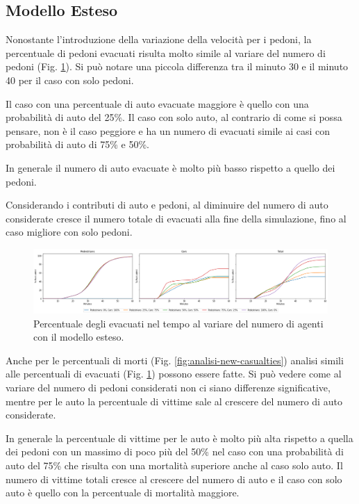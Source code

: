 \pagebreak

\subsection{Modello Esteso}
Nonostante l'introduzione della variazione della velocità per i pedoni,
la percentuale di pedoni evacuati risulta molto simile al variare del numero di pedoni (Fig. \ref{fig:analisi-new-evacuated}).
Si può notare una piccola differenza tra il minuto 30 e il minuto 40 per il caso con solo pedoni.

Il caso con una percentuale di auto evacuate maggiore è quello con una probabilità di auto del 25\%.
Il caso con solo auto, al contrario di come si possa pensare, non è il caso peggiore e ha un numero di evacuati simile ai casi
con probabilità di auto di 75\% e 50\%.

In generale il numero di auto evacuate è molto più basso rispetto a quello dei pedoni.

Considerando i contributi di auto e pedoni, al diminuire del numero di auto considerate cresce il numero totale di evacuati alla fine della simulazione,
fino al caso migliore con solo pedoni.

\begin{figure}[ht]
    \centering
    \includegraphics[width=\textwidth]{images/analisi/new-evacuated.png}
    \caption{Percentuale degli evacuati nel tempo al variare del numero di agenti con il modello esteso.}
    \label{fig:analisi-new-evacuated}
\end{figure}

Anche per le percentuali di morti (Fig. \ref{fig:analisi-new-casualties}) analisi simili alle percentuali di evacuati (Fig. \ref{fig:analisi-new-evacuated})
possono essere fatte.
%
Si può vedere come al variare del numero di pedoni considerati non ci siano differenze significative,
mentre per le auto la percentuale di vittime sale al crescere del numero di auto considerate.

In generale la percentuale di vittime per le auto è molto più alta rispetto a quella dei pedoni
con un massimo di poco più del 50\% nel caso con una probabilità di auto del 75\% che risulta con una mortalità superiore anche al caso solo auto.
%
Il numero di vittime totali cresce al crescere del numero di auto e il caso con solo auto è quello con la percentuale di mortalità maggiore.

